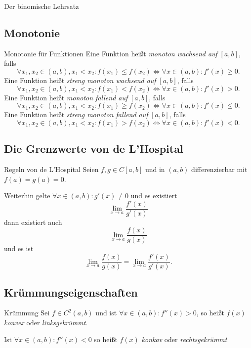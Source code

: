 \documentclass[german]{spicker}
\begin{document}
\begin{defi}{Der binomische Lehrsatz}
\subsection{Monotonie}

\begin{defi}{Monotonie für Funktionen}
    Eine Funktion heißt \emph{monoton wachsend auf} $[a, b]$, falls
    $$
        \forall x_1, x_2 \in (a, b), x_1 < x_2 : f(x_1) \leq f(x_2) \iff \forall x \in (a, b): f'(x) \geq 0.
    $$
    Eine Funktion heißt \emph{streng monoton wachsend auf} $[a, b]$, falls
    $$
        \forall x_1, x_2 \in (a, b), x_1 < x_2 : f(x_1) < f(x_2) \iff \forall x \in (a, b): f'(x) > 0.
    $$
    Eine Funktion heißt \emph{monoton fallend auf} $[a, b]$, falls
    $$
        \forall x_1, x_2 \in (a, b), x_1 < x_2 : f(x_1) \geq f(x_2) \iff \forall x \in (a, b): f'(x) \leq 0.
    $$
    Eine Funktion heißt \emph{streng monoton fallend auf} $[a, b]$, falls
    $$
        \forall x_1, x_2 \in (a, b), x_1 < x_2 : f(x_1) > f(x_2) \iff \forall x \in (a, b): f'(x) < 0.
    $$
\end{defi}

\subsection{Die Grenzwerte von de L'Hospital}

\begin{defi}{Regeln von de L'Hospital}
    Seien $f, g \in C[a, b]$ und in $(a, b)$ differenzierbar mit $f(a) = g(a) = 0$.

    Weiterhin gelte $\forall x \in (a, b): g'(x) \neq 0$ und es existiert
    $$
        \lim_{x\to a} \frac{f'(x)}{g'(x)}
    $$
    dann existiert auch
    $$
        \lim_{x\to a } \frac{f(x)}{g(x)}
    $$
    und es ist
    $$
        \lim_{x\to a } \frac{f(x)}{g(x)} = \lim_{x\to a} \frac{f'(x)}{g'(x)}.
    $$
\end{defi}

\subsection{Krümmungseigenschaften}

\begin{defi}{Krümmung}
    Sei $f\in C^2(a, b)$ und ist $\forall x \in (a, b) : f''(x) > 0$, so heißt $f(x)$ \emph{konvex} oder \emph{linksgekrümmt}.

    Ist $\forall x \in (a, b) : f''(x) < 0$ so heißt $f(x)$ \emph{konkav} oder \emph{rechtsgekrümmt}
\end{defi}


\end{defi}
\end{document}
